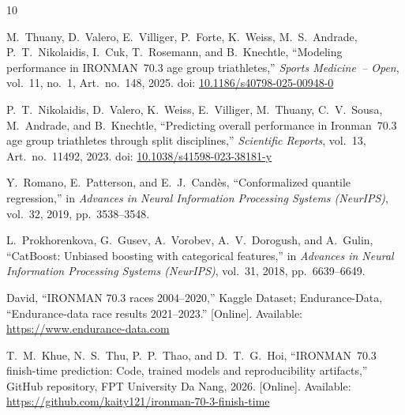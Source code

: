 \documentclass[11pt,a4paper]{article}
\providecommand{\doi}[1]{doi: \href{https://doi.org/#1}{#1}}
\begin{document}

\begin{thebibliography}{10}

M.~Thuany, D.~Valero, E.~Villiger, P.~Forte, K.~Weiss, M.~S.~Andrade,
P.~T.~Nikolaidis, I.~Cuk, T.~Rosemann, and B.~Knechtle,
``Modeling performance in {IRONMAN}~70.3 age group triathletes,''
\emph{Sports Medicine~-- Open}, vol.~11, no.~1, Art.\ no.~148, 2025.
\newblock \doi{10.1186/s40798-025-00948-0}

P.~T.~Nikolaidis, D.~Valero, K.~Weiss, E.~Villiger, M.~Thuany,
C.~V.~Sousa, M.~Andrade, and B.~Knechtle,
``Predicting overall performance in {Ironman}~70.3 age group
triathletes through split disciplines,''
\emph{Scientific Reports}, vol.~13, Art.\ no.~11492, 2023.
\newblock \doi{10.1038/s41598-023-38181-y}

Y.~Romano, E.~Patterson, and E.~J.~Cand\`{e}s,
``Conformalized quantile regression,''
in \emph{Advances in Neural Information Processing Systems (NeurIPS)},
vol.~32, 2019, pp.~3538--3548.

L.~Prokhorenkova, G.~Gusev, A.~Vorobev, A.~V.~Dorogush,
and A.~Gulin,
``{CatBoost}: Unbiased boosting with categorical features,''
in \emph{Advances in Neural Information Processing Systems (NeurIPS)},
vol.~31, 2018, pp.~6639--6649.

David,
``{IRONMAN} 70.3 races 2004--2020,''
Kaggle Dataset; Endurance-Data, ``Endurance-data race results
2021--2023.'' [Online]. Available: \url{https://www.endurance-data.com}

T.~M.~Khue, N.~S.~Thu, P.~P.~Thao, and D.~T.~G.~Hoi,
``{IRONMAN}~70.3 finish-time prediction: Code, trained models and
reproducibility artifacts,''
GitHub repository, FPT University Da Nang, 2026. [Online].
Available: \url{https://github.com/kaity121/ironman-70-3-finish-time}

\end{thebibliography}
\end{document}
